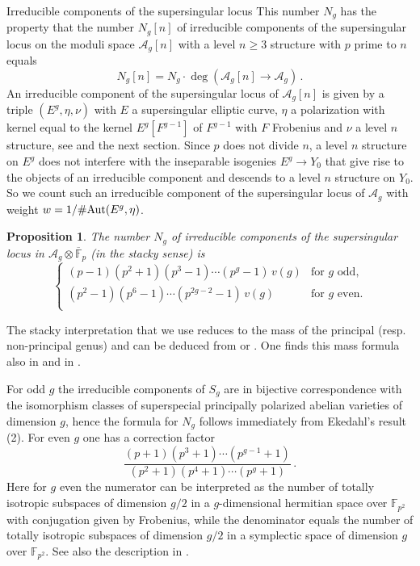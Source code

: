 \documentclass[11pt]{amsart}
\numberwithin{equation}{section}
\newcommand{\FF}{\mathbb F}
\newcommand{\A}{\mathcal A}
\newtheorem{proposition}[theorem]{Proposition}
\theoremstyle{definition}
\theoremstyle{remark}
\begin{document}
\begin{section}{Irreducible components of the supersingular locus}
This number $N_g$ has the property that the 
number $N_g[n]$ of irreducible components of the
supersingular locus on the moduli space ${\A}_g[n]$ with a level
$n \geq 3$ structure with $p$ prime to $n$ equals 
$$
N_g[n]=N_g \cdot
\deg({\A}_g[n]\to {\A}_g)\, .
$$
An irreducible component of the supersingular locus of
$\mathcal{A}_g[n]$ is given by a triple $(E^g, \eta, \nu)$
with $E$ a supersingular elliptic curve, $\eta$ a polarization with
kernel equal to the kernel $E^g[F^{g-1}]$ of $F^{g-1}$ with $F$ Frobenius 
and $\nu$ a level $n$ structure, see \cite{L-O} and the next section. 
Since
$p$ does not divide $n$, a level $n$ structure on $E^g$ does not interfere
with the inseparable isogenies $E^g \to Y_0$ that give rise to the objects of
an irreducible component and descends to a level $n$ structure on $Y_0$.
So we count such an  irreducible component of the supersingular locus of $\mathcal{A}_g$
with weight $w=1/\# {\rm Aut}(E^g,\eta)$. 
\begin{proposition}\label{Ng}
The number $N_g$
of irreducible components of the supersingular locus in 
$\mathcal{A}_g \otimes \overline{\FF}_p$ (in the stacky sense) is
$$
\begin{cases}
(p-1)(p^2+1)(p^3-1)\cdots (p^g-1) \, v(g) & \text{for $g$ odd}, \\
(p^2-1)(p^6-1)\cdots (p^{2g-2}-1)\, v(g) & \text{for $g$ even}. \\
\end{cases}
$$
\end{proposition}
The stacky interpretation that we use reduces to the mass of
the principal (resp. non-principal genus) and can be deduced from
\cite{Ekedahl1987} or \cite{H-I}.
One finds this mass formula also in  \cite[p.\ 123]{Gan-Hanke-Yu} and
in \cite{Yu}.

For odd $g$ the irreducible components of $S_g$ are in
bijective correspondence with the isomorphism classes of superspecial
principally polarized abelian varieties of dimension $g$, hence
the formula for $N_g$ follows immediately from Ekedahl's result (2).
For even $g$ one has a correction factor 
$$
\frac{(p+1)(p^3+1)\cdots (p^{g-1}+1)}{(p^2+1)(p^4+1)\cdots (p^{g}+1)}\, .
$$
Here for $g$ even the numerator can be interpreted as the number of 
totally isotropic subspaces of dimension $g/2$ 
in a $g$-dimensional
hermitian space over ${\FF}_{p^2}$ with conjugation given by Frobenius,
while the denominator equals the 
number of totally isotropic subspaces of dimension $g/2$
in a symplectic space of dimension $g$ over ${\FF}_{p^2}$. See also the
description in 
\cite{Yu}. 
\end{section}
\end{document}
